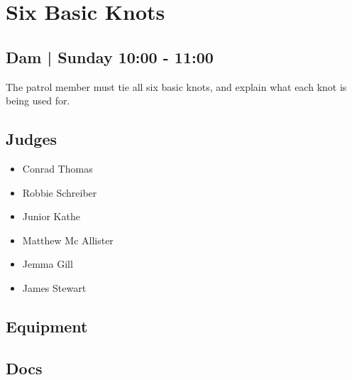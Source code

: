 \documentclass[10pt]{article}
\begin{document}
		\begin{minipage}{\linewidth}
		\setcounter{section}{35}
	\section{Six Basic Knots }
	\subsection*{Dam | Sunday 10:00 - 11:00}

	The patrol member must tie all six basic knots, and explain what each knot is being used for.

	\begin{multicols}{2}
	\subsection*{\faUsers \: Judges}
	\begin{itemize}
			\item Conrad Thomas
			\item Robbie Schreiber
			\item Junior Kathe
			\item Matthew Mc Allister
			\item Jemma Gill
			\item James Stewart
		\end{itemize}
	\columnbreak
	\subsection*{\faWrench \: Equipment}
	        \vfill\null
        \subsection*{\faFile \: Docs}
     	\end{multicols}


	\vspace{1cm}
	\end{minipage}
\end{document}
